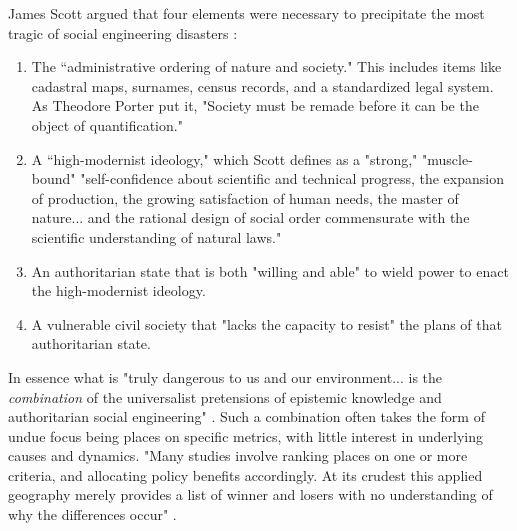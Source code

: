 James Scott argued that four elements were necessary to precipitate the most tragic of social engineering disasters \cite{scottSeeingStateHow2020}:

\begin{enumerate} \setlength{\itemsep}{0pt} \setlength{\parskip}{0pt} 
	\item{The ``administrative ordering of nature and society." This includes items like cadastral maps, surnames, census records, and a standardized legal system. As Theodore Porter put it, "Society must be remade before it can be the object of quantification." \cite{porter1992objectivity}}
	\item{A ``high-modernist ideology," which Scott defines as a "strong," "muscle-bound" "self-confidence about scientific and technical progress, the expansion of production, the growing satisfaction of human needs, the master of nature... and the rational design of social order commensurate with the scientific understanding of natural laws."}
	\item{An authoritarian state that is both "willing and able" to wield power to enact the high-modernist ideology.}
	\item{A vulnerable civil society that "lacks the capacity to resist" the plans of that authoritarian state.}
\end{enumerate}

In essence what is "truly dangerous to us and our environment... is the \textit{combination} of the universalist pretensions of epistemic knowledge and authoritarian social engineering" \cite{scottSeeingStateHow2020}. Such a combination often takes the form of undue focus being places on specific metrics, with little interest in underlying causes and dynamics. "Many studies involve ranking places on one or more criteria, and allocating policy benefits accordingly. At its crudest this applied geography merely provides a list of winner and losers with no understanding of why the differences occur" \cite{taylorGeographicInformationSystems1994}.

